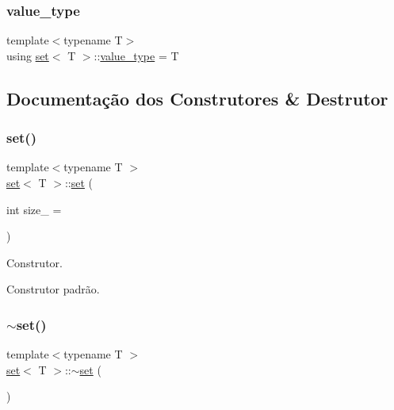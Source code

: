 \mbox{\label{classset_a9401e4f521bf0b6833a37ee4ab9fa67c}} 
\subsubsection{\texorpdfstring{value\+\_\+type}{value\_type}}
{\footnotesize\ttfamily template$<$typename T$>$ \\
using \hyperlink{classset}{set}$<$ T $>$\+::\hyperlink{classset_a9401e4f521bf0b6833a37ee4ab9fa67c}{value\+\_\+type} =  T}



\subsection{Documentação dos Construtores \& Destrutor}
\mbox{\label{classset_ad6a5925a93ad1edd160fe52976d9b516}} 
\subsubsection{\texorpdfstring{set()}{set()}}
{\footnotesize\ttfamily template$<$typename T $>$ \\
\hyperlink{classset}{set}$<$ T $>$\+::\hyperlink{classset}{set} (\begin{DoxyParamCaption}\item[{int}]{size\+\_\+ = {} }\end{DoxyParamCaption})}



Construtor. 

Construtor padrão. \mbox{\label{classset_ac47084748dafcedb0535fe6509d8e4cd}} 
\subsubsection{\texorpdfstring{$\sim$set()}{~set()}}
{\footnotesize\ttfamily template$<$typename T $>$ \\
\hyperlink{classset}{set}$<$ T $>$\+::$\sim$\hyperlink{classset}{set} (\begin{DoxyParamCaption}{ }\end{DoxyParamCaption})}



